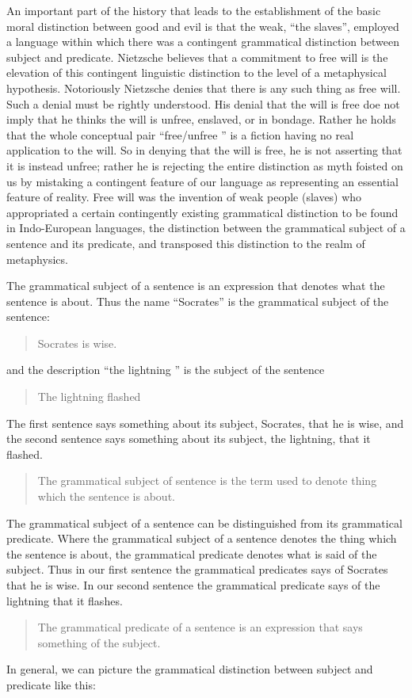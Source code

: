 An important part of the history that leads to the establishment of the basic moral distinction between good and evil is that the weak, ``the slaves'', employed a language within which there was a contingent grammatical distinction between subject and predicate. Nietzsche believes that a commitment to free will is the elevation of this contingent linguistic distinction to the level of a metaphysical hypothesis. Notoriously Nietzsche denies that there is any such thing as free will. Such a denial must be rightly understood. His denial that the will is free doe not imply that he thinks the will is unfree, enslaved, or in bondage. Rather he holds that the whole conceptual pair  ``free/unfree '' is a fiction having no real application to the will. So in denying that the will is free, he is not asserting that it is instead unfree; rather he is rejecting the entire distinction as myth foisted on us by mistaking a contingent feature of our language as representing an essential feature of reality. Free will was the invention of weak people (slaves) who appropriated a certain contingently existing grammatical distinction to be found in Indo-European languages, the distinction between the grammatical subject of a sentence and its predicate, and transposed this distinction to the realm of metaphysics.

The grammatical subject of a sentence is an expression that denotes what the sentence is about. Thus the name ``Socrates'' is the grammatical subject of the sentence:
\begin{quote}
	Socrates is wise.
\end{quote}
and the description ``the lightning '' is the subject of the sentence
\begin{quote}
	The lightning flashed
\end{quote}
The first sentence says something about its subject, Socrates, that he is wise, and the second sentence says something about its subject, the lightning, that it flashed.
\begin{quote}
	The grammatical subject of sentence is the term used to denote thing which the sentence is about. 
\end{quote}

The grammatical subject of a sentence can be distinguished from its grammatical predicate. Where the grammatical subject of a sentence denotes the thing which the sentence is about, the grammatical predicate denotes what is said of the subject. Thus in our first sentence the grammatical predicates says of Socrates that he is wise. In our second sentence the grammatical predicate says of the lightning that it flashes.
\begin{quote}
	The grammatical predicate of a sentence is an expression that says something of the subject.
\end{quote}
In general, we can picture the grammatical distinction between subject and predicate like this:



